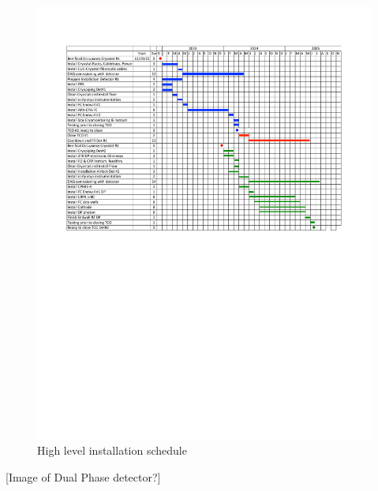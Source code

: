 \begin{figure}[htbp]
\begin{center}
\includegraphics[width=\textwidth]{far-detector-single-phase/figures/TP-Schedule-Feb2018.pdf}
\caption{High level installation schedule}
\label{Install-Schedule}
\end{center}
\end{figure}

[Image of Dual Phase detector?]


